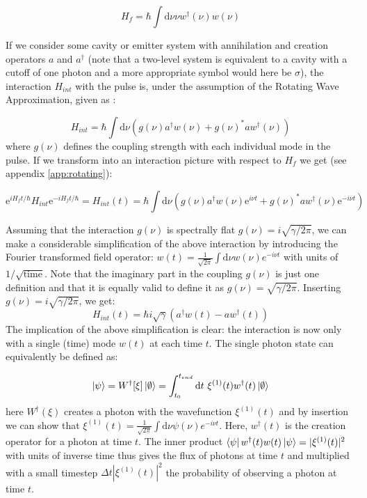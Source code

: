 \begin{equation}
    H_f= \hbar \int \mathrm{d} \nu \nu w^{\dagger}(\nu) w(\nu)
\end{equation}

If we consider some cavity or emitter system with annihilation and creation operators $a$ and $a^\dagger$ (note that a two-level system is equivalent to a cavity with a cutoff of one photon and a more appropriate symbol would here be $\sigma$), the interaction $H_{int}$ with the pulse is, under the assumption of the Rotating Wave Approximation, given as \cite{Ciccarello2018CollisionOptics}:

\begin{equation}
    H_{int} = \hbar \int \mathrm{d} \nu  \left(g(\nu) a^{\dagger} w(\nu) + g(\nu)^{*} a w^{\dagger}(\nu)\right)
\end{equation}
where $g(\nu)$ defines the coupling strength with each individual mode in the pulse. If we transform into an interaction picture with respect to $H_f$ we get (see appendix \ref{app:rotating}):

\begin{equation}
    \mathrm{e}^{i H_f t /\hbar} H_{int} \mathrm{e}^{-i H_f t /\hbar} = H_{int}(t) =  \hbar \int \mathrm{d} \nu \left(g(\nu) a^{\dagger} w(\nu) \mathrm{e}^{i\nu t} + g(\nu)^{*} a w^{\dagger}(\nu) \mathrm{e}^{-i\nu t}\right)
\end{equation}

Assuming that the interaction $g(\nu)$ is spectrally flat $g(\nu) = i \sqrt{\gamma/2 \pi}$, we can make a considerable simplification of the above interaction by introducing the Fourier transformed field operator: $w(t)=\frac{1}{\sqrt{2 \pi}} \int \mathrm{d} \nu w(\nu) e^{-i \nu t}$ with units of $1/\sqrt{\mathrm{time}}$. Note that the imaginary part in the coupling $g(\nu)$ is just one definition and that it is equally valid to define it as $g(\nu) = \sqrt{\gamma/2 \pi}$. Inserting $g(\nu) = i \sqrt{\gamma/2 \pi}$, we get:
\begin{equation}
    H_{int}(t) =  \hbar i \sqrt{\gamma} (a^\dagger w(t)-a w^\dagger(t) ) \label{eq:interaction}
\end{equation}
The implication of the above simplification is clear: the interaction is now only with a single (time) mode $w(t)$ at each time $t$. The single photon state can equivalently be defined as:

\begin{equation}
    \ket{\psi} = W^\dagger[\xi] \ket{\emptyset} = \int_{t_0}^{t_{end}} \mathrm{d}t \ \xi^{(1)}(t) w^\dagger(t) \ket{\emptyset} \label{eq:singlephoton}
\end{equation}
here $W^\dagger(\xi)$ creates a photon with the wavefunction $\xi^{(1)}(t)$ and by insertion we can show that $\xi^{(1)}(t) = \frac{1}{\sqrt{2 \pi}} \int \mathrm{d} \nu \psi(\nu) e^{-i \nu t} $. Here, $w^\dagger(t)$ is the creation operator for a photon at time $t$. The inner product $\bra{\psi} w^\dagger(t) w(t) \ket{\psi} = |\xi^{(1)}(t)|^2$ with units of inverse time thus gives the flux of photons at time $t$ and multiplied with a small timestep $\Delta t |\xi^{(1)}(t)|^2$ the probability of observing a photon at time $t$. 

